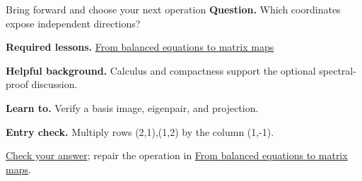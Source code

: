 \begin{learningcard}{Bring forward and choose your next operation}
\textsf{\textbf{Question.}} Which coordinates expose independent directions?\par
\textbf{Required lessons.} \hyperref[learn:matrix_maps]{From balanced equations to matrix maps}\par
\textbf{Helpful background.} Calculus and compactness support the optional spectral-proof discussion.\par
\textbf{Learn to.} Verify a basis image, eigenpair, and projection.\par
\textbf{Entry check.} Multiply rows (2,1),(1,2) by the column (1,-1).\par
\hyperref[solution:entry:linear_algebra]{Check your answer}; repair the operation in \hyperref[learn:matrix_maps]{From balanced equations to matrix maps}.
\end{learningcard}
